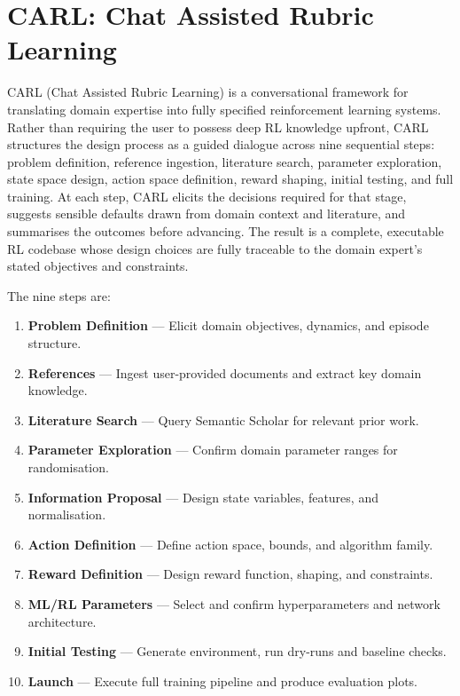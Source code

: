 \section{CARL: Chat Assisted Rubric Learning}

CARL (Chat Assisted Rubric Learning) is a conversational framework for
translating domain expertise into fully specified reinforcement learning
systems. Rather than requiring the user to possess deep RL knowledge
upfront, CARL structures the design process as a guided dialogue across
nine sequential steps: problem definition, reference ingestion, literature
search, parameter exploration, state space design, action space definition,
reward shaping, initial testing, and full training. At each step, CARL
elicits the decisions required for that stage, suggests sensible defaults
drawn from domain context and literature, and summarises the outcomes
before advancing. The result is a complete, executable RL codebase whose
design choices are fully traceable to the domain expert's stated objectives
and constraints.

The nine steps are:

\begin{enumerate}
    \item[\textbf{1.}] \textbf{Problem Definition} --- Elicit domain objectives, dynamics, and episode structure.
    \item[\textbf{2.}] \textbf{References} --- Ingest user-provided documents and extract key domain knowledge.
    \item[\textbf{2.5.}] \textbf{Literature Search} --- Query Semantic Scholar for relevant prior work.
    \item[\textbf{3.}] \textbf{Parameter Exploration} --- Confirm domain parameter ranges for randomisation.
    \item[\textbf{4.}] \textbf{Information Proposal} --- Design state variables, features, and normalisation.
    \item[\textbf{5.}] \textbf{Action Definition} --- Define action space, bounds, and algorithm family.
    \item[\textbf{6.}] \textbf{Reward Definition} --- Design reward function, shaping, and constraints.
    \item[\textbf{7.}] \textbf{ML/RL Parameters} --- Select and confirm hyperparameters and network architecture.
    \item[\textbf{8.}] \textbf{Initial Testing} --- Generate environment, run dry-runs and baseline checks.
    \item[\textbf{9.}] \textbf{Launch} --- Execute full training pipeline and produce evaluation plots.
\end{enumerate}

